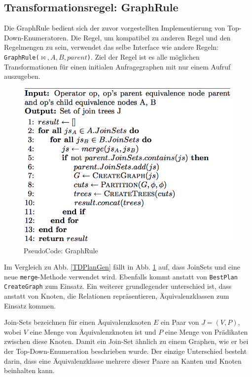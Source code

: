 {\subsection{Transformationsregel: GraphRule}

Die GraphRule \cite{shanbhag2014optimizing} bedient sich der zuvor vorgestellten Implementierung von Top-Down-Enumeratoren. Die Regel, um kompatibel zu anderen Regel und den Regelmengen zu sein, verwendet das selbe Interface wie andere Regeln: \texttt{GraphRule($\Join, A, B, parent$)}.  Ziel der Regel ist es alle möglichen Transformationen für einen initialen Anfragegraphen mit nur einem Aufruf auszugeben. 

\begin{figure}[ht]
  \centering
  \includegraphics[scale=0.4]{03_Regeln/00_media/GraphRule.png}
  \caption{PseudoCode: GraphRule}
  \label{GraphRule}
\end{figure}

Im Vergleich zu Abb. \ref{TDPlanGen} fällt in Abb. \ref{GraphRule} auf, dass JoinSets und eine neue \texttt{merge}-Methode verwendet wird. Ebenfalls kommt anstatt von \texttt{BestPlan} \texttt{CreateGraph} zum Einsatz. Ein weiterer grundlegender unterschied ist, dass anstatt von Knoten, die Relationen repräsentieren, Äquivalenzklassen zum Einsatz kommen.

Join-Sets bezeichnen für einen Äquivalenzknoten $E$ ein Paar von $J = (V,P)$, wobei $V$ eine Menge von Äquivalenzknoten ist und $P$ eine Menge von Prädikaten zwischen diese Knoten.  Damit ein Join-Set ähnlich zu einem Graphen, wie er bei der Top-Down-Enumeration beschrieben wurde. Der einzige Unterschied besteht darin, dass eine Äquivalenzklasse mehrere dieser Paare an Kanten und Knoten beinhalten kann.

}
